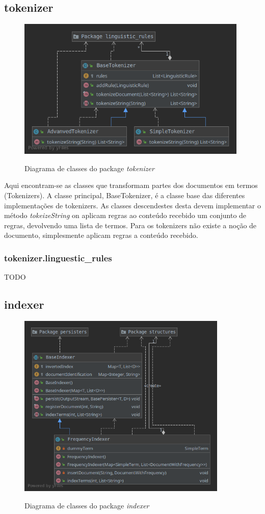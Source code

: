 \documentclass[12pt]{article}
\begin{document}
\subsection{tokenizer}
\begin{figure}[h]
  \center
  \includegraphics[width=11cm]{packages_tokenizer.png}
  \label{fig:packages_tokenizer}
  \caption{Diagrama de classes do package \it tokenizer}
\end{figure}

Aqui encontram-se as classes que transformam partes dos documentos em termos (Tokenizers). 
A classe principal, BaseTokenizer, é a classe base das diferentes implementações
de tokenizers. As classes descendestes desta devem implementar o método {\it tokeizeString}
on aplicam regras ao conteúdo recebido um conjunto de regras, devolvendo uma lista de termos.
Para os tokenizers não existe a noção de documento, simplesmente aplicam regras a
conteúdo recebido.

\subsubsection{tokenizer.linguestic\_rules}
TODO

\subsection{indexer}
\begin{figure}[h]
  \center
  \includegraphics[width=10cm]{packages_indexer.png}
  \label{fig:packages_indexer}
  \caption{Diagrama de classes do package \it indexer}
\end{figure}
\end{document}
